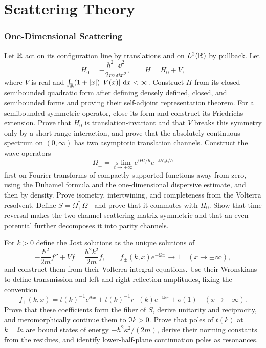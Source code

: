 \part{Scattering Theory}

\section{One-Dimensional Scattering}

\begin{exercise}
Let $\mathbb R$ act on its configuration line by translations and on $L^2(\mathbb R)$ by
pullback.  Let
\[
 H_0=-\frac{\hbar^2}{2m}\frac{\dd^2}{\dd x^2},\qquad H=H_0+V,
\]
where $V$ is real and
$\int_{\mathbb R}(1+\left\lvert x\right\rvert)\left\lvert V(x)\right\rvert\,\mathrm d x<\infty$.  Construct $H$ from its closed
semibounded quadratic form after defining densely defined, closed, and
semibounded forms and proving their self-adjoint representation theorem.
For a semibounded symmetric operator, close its form and construct its
Friedrichs extension.  Prove that $H_0$ is translation-invariant and
that $V$ breaks this symmetry only by a short-range interaction, and prove
that the absolutely continuous spectrum
on $(0,\infty)$ has two asymptotic translation channels.  Construct the wave
operators
\[
 \Omega_\pm=\operatorname*{s-lim}_{t\to\pm\infty}
 e^{\ii Ht/\hbar}e^{-\ii H_0t/\hbar}
\]
first on Fourier transforms of compactly supported functions away from zero,
using the Duhamel formula and the one-dimensional dispersive estimate, and
then by density.  Prove isometry, intertwining, and completeness from the
Volterra resolvent.  Define $S=\Omega_+^*\Omega_-$ and prove that it commutes
with $H_0$.  Show that time reversal makes the
two-channel scattering matrix symmetric and that an even potential further
decomposes it into parity channels.
\end{exercise}

\begin{exercise}
For $k>0$ define the Jost solutions as the unique solutions of
\[
 -\frac{\hbar^2}{2m}f''+Vf=\frac{\hbar^2k^2}{2m}f,
 \qquad f_\pm(k,x)e^{\mp\ii kx}\longrightarrow1
 \quad(x\to\pm\infty),
\]
and construct them from their Volterra integral equations.  Use their
Wronskians to define transmission and left and right reflection amplitudes,
fixing the convention
\[
 f_+(k,x)=t(k)^{-1}e^{\ii kx}
 +t(k)^{-1}r_-(k)e^{-\ii kx}+o(1)
 \quad(x\to-\infty).
\]
Prove that these coefficients form the fiber of $S$, derive unitarity and
reciprocity, and meromorphically continue them to $\Im k>0$.  Prove that poles
of $t(k)$ at $k=\ii\kappa$ are bound states of energy
$-\hbar^2\kappa^2/(2m)$, derive their norming constants from the residues, and
identify lower-half-plane continuation poles as resonances.
\end{exercise}

